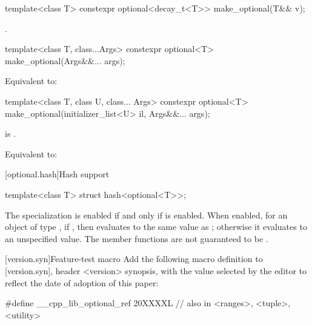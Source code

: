 %
\begin{itemdecl}
template<class T> constexpr optional<decay_t<T>> make_optional(T&& v);
\end{itemdecl}

\begin{itemdescr}
\pnum
\returns
{}.
\end{itemdescr}

%
\begin{itemdecl}
template<class T, class...Args>
  constexpr optional<T> make_optional(Args&&... args);
\end{itemdecl}

\begin{itemdescr}
\pnum
\effects
Equivalent to: 
\end{itemdescr}

%
\begin{itemdecl}
template<class T, class U, class... Args>
  constexpr optional<T> make_optional(initializer_list<U> il, Args&&... args);
\end{itemdecl}

\begin{itemdescr}
\begin{addedblock}
\pnum
\mandates
{} is .
\end{addedblock}

\pnum
\effects
Equivalent to: 
\end{itemdescr}


[optional.hash]{Hash support}
%
\begin{itemdecl}
template<class T> struct hash<optional<T>>;
\end{itemdecl}

\begin{itemdescr}
\pnum
The specialization  is enabled
if and only if   is enabled.
When enabled, for an object  of type ,
if , then 
evaluates to the same value as ;
otherwise it evaluates to an unspecified value.
The member functions are not guaranteed to be .
\end{itemdescr}

\begin{addedblock}
[version.syn]{Feature-test macro}
Add the following macro definition to [version.syn], header <version> synopsis, with the value selected by the editor to reflect the date of adoption of this paper:

\begin{codeblock}
  #define __cpp_lib_optional_ref 20XXXXL // also in <ranges>, <tuple>, <utility>
\end{codeblock}
\end{addedblock}
